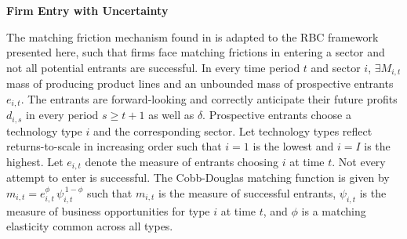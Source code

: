 \documentclass[a4paper,12pt]{article} %
\numberwithin{equation}{section} %
\numberwithin{figure}{section}
\numberwithin{table}{section}
\begin{document}
\medskip
\medskip
\noindent\textbf{Firm Entry with Uncertainty}
\medskip

The matching friction mechanism found in \textcite{sedlavcek2017growth} is adapted to the RBC framework presented here, such that firms face matching 
frictions in entering a sector and not all potential entrants are successful. In every time period $t$ and sector $i$, $\exists M_{i,t}$ mass of 
producing product lines and an unbounded mass of prospective entrants $e_{i,t}$. The entrants are forward-looking and correctly anticipate their future 
profits $d_{i,s}$ in every period $s\ge t+1$ as well as $\delta$. Prospective entrants choose a technology type $i$ and the corresponding sector.
Let technology types reflect returns-to-scale in increasing order such that $i = 1$ is the lowest and $i = I$ is the highest. 
Let $e_{i,t}$ denote the measure of entrants choosing $i$ at time $t$. Not every attempt to enter is successful. The Cobb-Douglas  matching function 
is given by $m_{i,t}= e_{i,t}^{\phi}\,\psi_{i,t}^{\,1-\phi}$ such that $m_{i,t}$ is the measure of successful entrants, $\psi_{i,t}$ is the measure of 
business opportunities for type $i$ at time $t$, and $\phi$ is a matching elasticity common across all types. 
\end{document}
